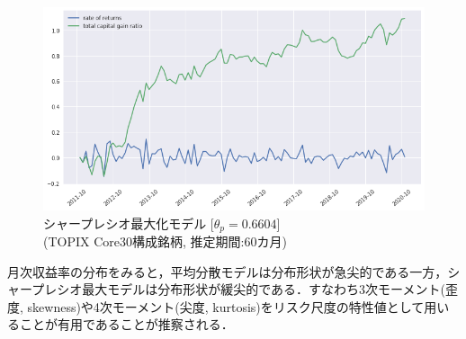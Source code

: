 \documentclass[dvipdfmx,autodetect-engine]{jsarticle}
\begin{document}
\begin{figure}[htbp]
\begin{minipage}{0.5\hsize}
\begin{center}
\includegraphics[width=1.0\hsize]{./figures/srmp_tpx30_w=60_plot.png}
\end{center}
\caption{\small シャープレシオ最大化モデル [$\theta_p=0.6604$]\\(TOPIX Core30構成銘柄, 推定期間:60カ月)}
\label{fig:32}
\end{minipage}
\end{figure}

\newpage

月次収益率の分布をみると，平均分散モデルは分布形状が急尖的である一方，シャープレシオ最大モデルは分布形状が緩尖的である．すなわち3次モーメント(歪度, skewness)や4次モーメント(尖度, kurtosis)をリスク尺度の特性値として用いることが有用であることが推察される．
\end{document}
